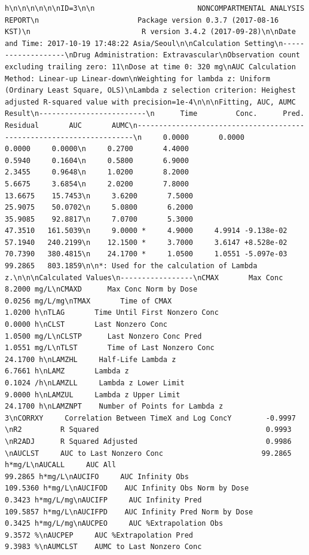 \documentclass[]{krantz}
\theoremstyle{definition}
\theoremstyle{definition}
\theoremstyle{definition}
\theoremstyle{remark}
\begin{document}
\begin{verbatim}
h\n\n\n\n\n\nID=3\n\n                        NONCOMPARTMENTAL ANALYSIS REPORT\n                       Package version 0.3.7 (2017-08-16 KST)\n                          R version 3.4.2 (2017-09-28)\n\nDate and Time: 2017-10-19 17:48:22 Asia/Seoul\n\nCalculation Setting\n-------------------\nDrug Administration: Extravascular\nObservation count excluding trailing zero: 11\nDose at time 0: 320 mg\nAUC Calculation Method: Linear-up Linear-down\nWeighting for lambda z: Uniform (Ordinary Least Square, OLS)\nLambda z selection criterion: Heighest adjusted R-squared value with precision=1e-4\n\n\nFitting, AUC, AUMC Result\n-------------------------\n      Time         Conc.      Pred.   Residual       AUC       AUMC\n---------------------------------------------------------------------\n     0.0000       0.0000                           0.0000     0.0000\n     0.2700       4.4000                           0.5940     0.1604\n     0.5800       6.9000                           2.3455     0.9648\n     1.0200       8.2000                           5.6675     3.6854\n     2.0200       7.8000                          13.6675    15.7453\n     3.6200       7.5000                          25.9075    50.0702\n     5.0800       6.2000                          35.9085    92.8817\n     7.0700       5.3000                          47.3510   161.5039\n     9.0000 *     4.9000     4.9914 -9.138e-02    57.1940   240.2199\n    12.1500 *     3.7000     3.6147 +8.528e-02    70.7390   380.4815\n    24.1700 *     1.0500     1.0551 -5.097e-03    99.2865   803.1859\n\n*: Used for the calculation of Lambda z.\n\n\nCalculated Values\n-----------------\nCMAX       Max Conc                                        8.2000 mg/L\nCMAXD      Max Conc Norm by Dose                           0.0256 mg/L/mg\nTMAX       Time of CMAX                                    1.0200 h\nTLAG       Time Until First Nonzero Conc                   0.0000 h\nCLST       Last Nonzero Conc                               1.0500 mg/L\nCLSTP      Last Nonzero Conc Pred                          1.0551 mg/L\nTLST       Time of Last Nonzero Conc                      24.1700 h\nLAMZHL     Half-Life Lambda z                              6.7661 h\nLAMZ       Lambda z                                        0.1024 /h\nLAMZLL     Lambda z Lower Limit                            9.0000 h\nLAMZUL     Lambda z Upper Limit                           24.1700 h\nLAMZNPT    Number of Points for Lambda z                   3\nCORRXY     Correlation Between TimeX and Log ConcY        -0.9997 \nR2         R Squared                                       0.9993 \nR2ADJ      R Squared Adjusted                              0.9986 \nAUCLST     AUC to Last Nonzero Conc                       99.2865 h*mg/L\nAUCALL     AUC All                                        99.2865 h*mg/L\nAUCIFO     AUC Infinity Obs                              109.5360 h*mg/L\nAUCIFOD    AUC Infinity Obs Norm by Dose                   0.3423 h*mg/L/mg\nAUCIFP     AUC Infinity Pred                             109.5857 h*mg/L\nAUCIFPD    AUC Infinity Pred Norm by Dose                  0.3425 h*mg/L/mg\nAUCPEO     AUC %Extrapolation Obs                          9.3572 %\nAUCPEP     AUC %Extrapolation Pred                         9.3983 %\nAUMCLST    AUMC to Last Nonzero Conc        
\end{verbatim}
\end{document}
